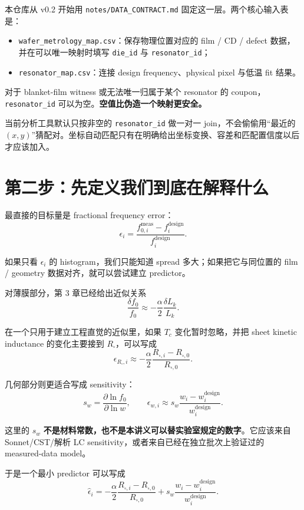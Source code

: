本仓库从 v0.2 开始用 \texttt{notes/DATA\_CONTRACT.md} 固定这一层。两个核心输入表是：

\begin{itemize}
  \item \texttt{wafer\_metrology\_map.csv}：保存物理位置对应的 film / CD / defect 数据，并在可以唯一映射时填写 \texttt{die\_id} 与 \texttt{resonator\_id}；
  \item \texttt{resonator\_map.csv}：连接 design frequency、physical pixel 与低温 fit 结果。
\end{itemize}

对于 blanket-film witness 或无法唯一归属于某个 resonator 的 coupon，\texttt{resonator\_id} 可以为空。\textbf{空值比伪造一个映射更安全。}

\begin{warningbox}
当前分析工具默认只按非空的 \texttt{resonator\_id} 做一对一 join，不会偷偷用“最近的 $(x,y)$”猜配对。坐标自动匹配只有在明确给出坐标变换、容差和匹配置信度以后才应该加入。
\end{warningbox}

\section{第二步：先定义我们到底在解释什么}

最直接的目标量是 fractional frequency error：
\[
\epsilon_i
=
\frac{f_{0,i}^{\mathrm{meas}}-f_i^{\mathrm{design}}}
{f_i^{\mathrm{design}}}.
\]

如果只看 $\epsilon_i$ 的 histogram，我们只能知道 spread 多大；如果把它与同位置的 film / geometry 数据对齐，就可以尝试建立 predictor。

对薄膜部分，第 3 章已经给出近似关系
\[
\frac{\delta f_0}{f_0}
\approx
-\frac{\alpha}{2}
\frac{\delta L_k}{L_k}.
\]

在一个只用于建立工程直觉的近似里，如果 $T_c$ 变化暂时忽略，并把 sheet kinetic inductance 的变化主要接到 $R_\square$，可以写成
\[
\epsilon_{R_\square,i}
\approx
-\frac{\alpha}{2}
\frac{R_{\square,i}-R_{\square,0}}{R_{\square,0}}.
\]

几何部分则更适合写成 sensitivity：
\[
s_w
=
\frac{\partial \ln f_0}{\partial \ln w},
\qquad
\epsilon_{w,i}
\approx
s_w
\frac{w_i-w_{i}^{\mathrm{design}}}{w_{i}^{\mathrm{design}}}.
\]

这里的 $s_w$ \textbf{不是材料常数，也不是本讲义可以替实验室规定的数字}。它应该来自 Sonnet/CST/解析 LC sensitivity，或者来自已经在独立批次上验证过的 measured-data model。

于是一个最小 predictor 可以写成
\[
\hat{\epsilon}_i
=
-\frac{\alpha}{2}
\frac{R_{\square,i}-R_{\square,0}}{R_{\square,0}}
+
s_w
\frac{w_i-w_i^{\mathrm{design}}}{w_i^{\mathrm{design}}}.
\]


